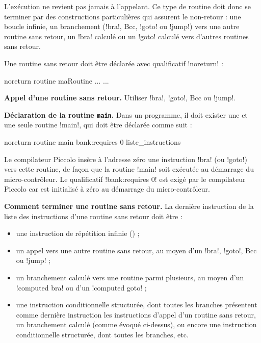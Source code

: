 L’exécution ne revient pas jamais à l’appelant. Ce type de routine doit donc se terminer par des constructions particulières qui assurent le non-retour : une boucle infinie, un branchement (\pic!bra!, Bcc, \pic!goto! ou \pic!jump!) vers une autre routine sans retour, un \pic!bra! calculé ou un \pic!goto! calculé vers d’autres routines sans retour.

Une routine sans retour doit être déclarée avec qualificatif \pic!noreturn! :
\begin{piccolo}
noreturn routine maRoutine ... {
  ...
}
\end{piccolo}

\textbf{Appel d’une routine sans retour.} Utiliser \pic!bra!, \pic!goto!, Bcc ou \pic!jump!.


\textbf{Déclaration de la routine \texttt{main}.} Dans un programme, il doit exister une et une seule routine \pic!main!, qui doit être déclarée comme suit :

\begin{piccolo}
noreturn routine main bank:requires 0 {
   liste_instructions
}

\end{piccolo}

Le compilateur Piccolo insère à l’adresse zéro une instruction \pic!bra! (ou \pic!goto!) vers cette routine, de façon que la routine \pic!main! soit exécutée au démarrage du micro-contrôleur. Le qualificatif \pic!bank:requires 0! est exigé par le compilateur Piccolo car  est initialisé à zéro au démarrage du micro-contrôleur.


\textbf{Comment terminer une routine sans retour.} La dernière instruction de la liste des instructions d’une routine sans retour doit être :
\begin{itemize}
  \item une instruction de répétition infinie () ;
  \item un appel vers une autre routine sans retour, au moyen d’un \pic!bra!, \pic!goto!, Bcc ou \pic!jump! ;
  \item un branchement calculé vers une routine parmi plusieurs, au moyen d’un \pic!computed bra! ou d’un \pic!computed goto! ;
  \item une instruction conditionnelle structurée, dont toutes les branches présentent comme dernière instruction les instructions d’appel d’un routine sans retour, un branchement calculé (comme évoqué ci-dessus), ou encore une instruction conditionnelle structurée, dont toutes les branches, etc.

\end{itemize}

